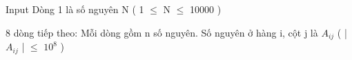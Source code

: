 Input
Dòng 1 là số nguyên N ( 1  $\le$  N  $\le$  10000 )  

   8 dòng tiếp theo: Mỗi dòng gồm n số nguyên. Số nguyên ở hàng i, cột j là $A_{ij}$   ( |$A_{ij}$   |  $\le$  $10^{8}$   )